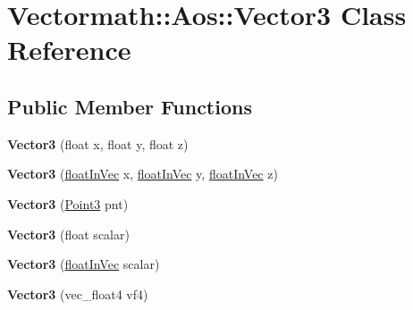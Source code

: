 \hypertarget{classVectormath_1_1Aos_1_1Vector3}{\section{Vectormath\-:\-:Aos\-:\-:Vector3 Class Reference}
\label{classVectormath_1_1Aos_1_1Vector3}
}
\subsection*{Public Member Functions}
\begin{DoxyCompactItemize}
\item 
\hypertarget{classVectormath_1_1Aos_1_1Vector3_afdc94668060aaeb330502e69aa6d7a74}{{\bfseries Vector3} (float x, float y, float z)}\label{classVectormath_1_1Aos_1_1Vector3_afdc94668060aaeb330502e69aa6d7a74}

\item 
\hypertarget{classVectormath_1_1Aos_1_1Vector3_a2925f345e01372e3a4fc90aca945dd67}{{\bfseries Vector3} (\hyperlink{classVectormath_1_1floatInVec}{float\-In\-Vec} x, \hyperlink{classVectormath_1_1floatInVec}{float\-In\-Vec} y, \hyperlink{classVectormath_1_1floatInVec}{float\-In\-Vec} z)}\label{classVectormath_1_1Aos_1_1Vector3_a2925f345e01372e3a4fc90aca945dd67}

\item 
\hypertarget{classVectormath_1_1Aos_1_1Vector3_aca6f628c50eb4eee21a5ce80b7acf585}{{\bfseries Vector3} (\hyperlink{classVectormath_1_1Aos_1_1Point3}{Point3} pnt)}\label{classVectormath_1_1Aos_1_1Vector3_aca6f628c50eb4eee21a5ce80b7acf585}

\item 
\hypertarget{classVectormath_1_1Aos_1_1Vector3_a71c6e33bbbd6cd3e3c93b08f3f29abb0}{{\bfseries Vector3} (float scalar)}\label{classVectormath_1_1Aos_1_1Vector3_a71c6e33bbbd6cd3e3c93b08f3f29abb0}

\item 
\hypertarget{classVectormath_1_1Aos_1_1Vector3_a1a6f7f54e58f1746d91b7c59a8821c4b}{{\bfseries Vector3} (\hyperlink{classVectormath_1_1floatInVec}{float\-In\-Vec} scalar)}\label{classVectormath_1_1Aos_1_1Vector3_a1a6f7f54e58f1746d91b7c59a8821c4b}

\item 
\hypertarget{classVectormath_1_1Aos_1_1Vector3_a9aaee015c69771b0e9773ced0b5d1b6b}{{\bfseries Vector3} (vec\-\_\-float4 vf4)}\label{classVectormath_1_1Aos_1_1Vector3_a9aaee015c69771b0e9773ced0b5d1b6b}


\end{DoxyCompactItemize}
